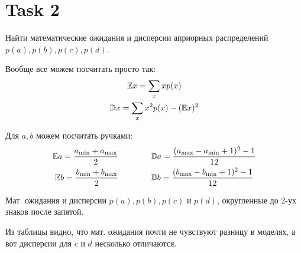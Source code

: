 \section{Task 2}

\begin{task}
    Найти математические ожидания и дисперсии априорных распределений $p(a), p(b), p(c), p(d)$.
\end{task}


\begin{solution}
    Вообще все можем посчитать просто так:
    \begin{gather}
        \mathbb{E} x = \sum_x x p(x) \\
        \mathbb{D} x = \sum_x x^2 p(x) - (\mathbb{E} x)^2
    \end{gather}

    Для $a, b$ можем посчитать ручками:
    \begin{gather}
        \mathbb{E} a = \frac{a_{\min} + a_{\max}}{2} \qquad \qquad \mathbb{D} a = \frac{(a_{\max} - a_{\min} + 1)^2 - 1}{12} \\
        \mathbb{E} b = \frac{b_{\min} + b_{\max}}{2} \qquad \qquad \mathbb{D} b = \frac{(b_{\max} - b_{\min} + 1)^2 - 1}{12} \\
    \end{gather}

    \begin{table}[H]
        \centering
        \caption{Мат. ожидания и дисперсии $p(a), p(b), p(c)$ и $p(d)$, округленные до 2-ух знаков после запятой.}
    \end{table}

    Из таблицы видно, что мат. ожидания почти не чувствуют разницу в моделях, а вот дисперсии для $c$ и $d$ несколько отличаются.
\end{solution}

\newpage
